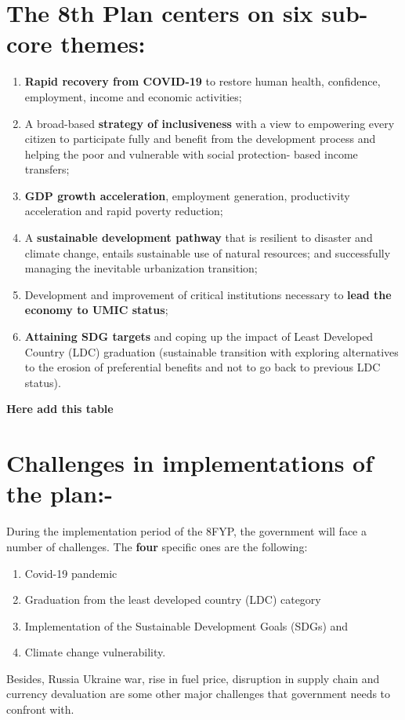 \documentclass[a4paper,12pt]{book}
\begin{document}
\section{The 8th Plan centers on six sub-core themes:}
\begin{enumerate}
    \item \textbf{Rapid recovery from \textbf{COVID-19}} to restore human health, confidence, employment, income and economic
activities;
\item  A broad-based \textbf{strategy of inclusiveness} with a view to empowering every citizen to participate fully and
benefit from the development process and helping the poor and vulnerable with social protection- based income
transfers;
\item \textbf{\textbf{GDP} growth acceleration}, employment generation, productivity acceleration and rapid poverty reduction;
\item A \textbf{sustainable development pathway} that is resilient to disaster and climate change, entails sustainable use
of natural resources; and successfully managing the inevitable urbanization transition;
\item Development and improvement of critical institutions necessary to \textbf{lead the economy to \textbf{UMIC} status};
\item \textbf{Attaining \textbf{SDG} targets} and coping up the impact of Least Developed Country (LDC) graduation
(sustainable transition with exploring alternatives to the erosion of preferential benefits and not to go back to
previous LDC status).
\end{enumerate}

\textbf{\textbf{\textbf{\textbf{Here add this table}}}}

\section{Challenges in implementations of the plan:-}
During the implementation period of the 8FYP, the government will face a number of challenges. The \textbf{four} specific ones are the following:
\begin{enumerate}
    \item Covid-19 pandemic
\item Graduation from the least developed country (LDC) category
\item Implementation of the Sustainable Development Goals (SDGs) and
\item Climate change vulnerability.
\end{enumerate} 
Besides, Russia Ukraine war, rise in fuel price, disruption in supply chain and currency devaluation are some other major challenges that government needs to confront with.
\end{document}
